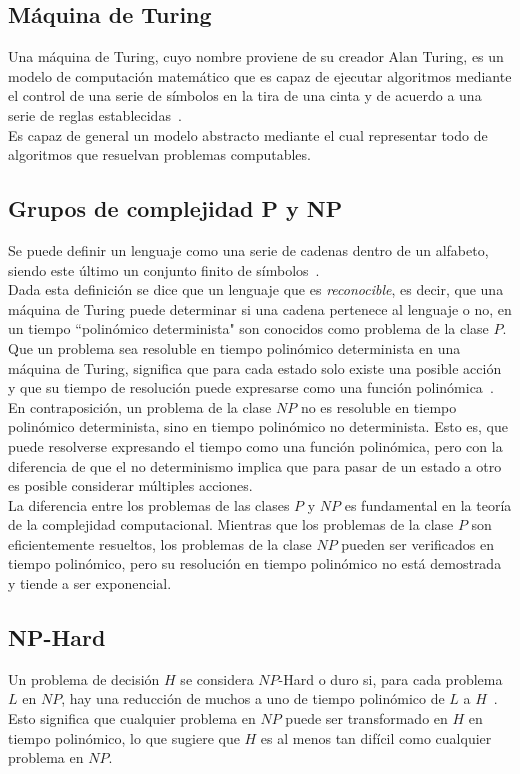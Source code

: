 \subsection{Máquina de Turing}
Una máquina de Turing, cuyo nombre proviene de su creador Alan Turing, es un modelo de computación matemático que es capaz de ejecutar algoritmos mediante el control de una serie de símbolos en la tira de una cinta y de acuerdo a una serie de reglas establecidas~\cite{stone1972}.\\[6pt]
Es capaz de general un modelo abstracto mediante el cual representar todo de algoritmos que resuelvan problemas computables.

\subsection{Grupos de complejidad P y NP}\label{complexity}
Se puede definir un lenguaje como una serie de cadenas dentro de un alfabeto, siendo este último un conjunto finito de símbolos~\cite{johnjeffery_automata}. \\[6pt]
Dada esta definición se dice que un lenguaje que es \textit{reconocible}, es decir, que una máquina de Turing puede determinar si una cadena pertenece al lenguaje o no, en un tiempo ``polinómico determinista" son conocidos como problema de la clase $P$. Que un problema sea resoluble en tiempo polinómico determinista en una máquina de Turing, significa que para cada estado solo existe una posible acción y que su tiempo de resolución puede expresarse como una función polinómica~\cite{johnjeffery_automata}. \\[6pt]
En contraposición, un problema de la clase $NP$ no es resoluble en tiempo polinómico determinista, sino en tiempo polinómico no determinista. Esto es, que puede resolverse expresando el tiempo como una función polinómica, pero con la diferencia de que el no determinismo implica que para pasar de un estado a otro es posible considerar múltiples acciones.\\[6pt]
La diferencia entre los problemas de las clases $P$ y $NP$ es fundamental en la teoría de la complejidad computacional. Mientras que los problemas de la clase $P$ son eficientemente resueltos, los problemas de la clase $NP$ pueden ser verificados en tiempo polinómico, pero su resolución en tiempo polinómico no está demostrada y tiende a ser exponencial.

\subsection{NP-Hard}
Un problema de decisión $H$ se considera $NP$-Hard o duro si, para cada problema $L$ en $NP$, hay una reducción de muchos a uno de tiempo polinómico de $L$ a $H$~\cite{leeuwen_algorithms_1998,johnjeffery_automata}. Esto significa que cualquier problema en $NP$ puede ser transformado en $H$ en tiempo polinómico, lo que sugiere que $H$ es al menos tan difícil como cualquier problema en $NP$.

